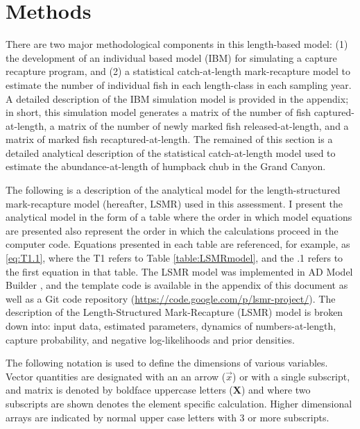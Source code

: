 \section{Methods} %
\label{sec:methods}

There are two major methodological components in this length-based model: (1) the development of an individual based model (IBM) for simulating a capture recapture program, and (2) a statistical catch-at-length mark-recapture model to estimate the number of individual fish in each length-class in each sampling year.  A detailed description of the IBM simulation model is provided in the appendix; in short, this simulation model generates a matrix of the number of fish captured-at-length, a matrix of the number of newly marked fish released-at-length, and a matrix of marked fish recaptured-at-length.  The remained of this section is a detailed analytical description of the statistical catch-at-length model used to estimate the abundance-at-length of humpback chub in the Grand Canyon.

The following is a description of the analytical model for the length-structured mark-recapture model (hereafter, LSMR) used in this assessment.  I present the analytical model in the form of a table where the order in which model equations are presented also represent the order in which the calculations proceed in the computer code.  Equations presented in each table are referenced, for example, as \eqref{eq:T1.1}, where the T1 refers to Table \ref{table:LSMRmodel}, and the .1 refers to the first equation in that table. The LSMR model was implemented in AD Model Builder \citep{fournier2011ad}, and the template code is available in the appendix of this document as well as a Git code repository (\url{https://code.google.com/p/lsmr-project/}).  The description of the Length-Structured Mark-Recapture (LSMR) model is broken down into: input data, estimated parameters, dynamics of numbers-at-length, capture probability, and negative log-likelihoods and prior densities.

The following notation is used to define the dimensions of various variables. Vector quantities are designated with an an arrow ($\vec{x}$) or with a single subscript, and matrix is denoted by boldface uppercase letters ($\mathbf{X}$) and where two subscripts are shown denotes the element specific calculation.  Higher dimensional arrays are indicated by normal upper case letters with 3 or more subscripts.  

